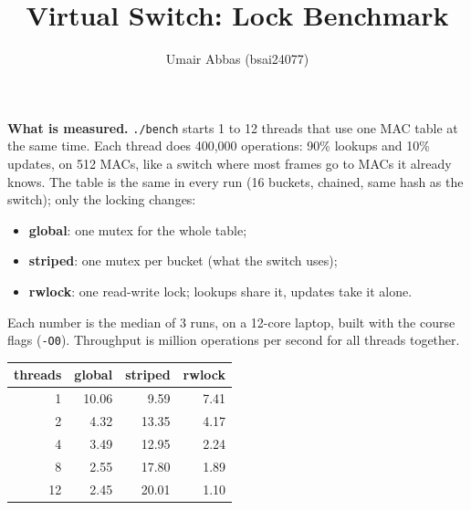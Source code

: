 \documentclass[11pt,a4paper]{article}
\title{Virtual Switch: Lock Benchmark}
\author{Umair Abbas \quad (bsai24077)}
\date{}
\begin{document}
\maketitle
\vspace{-1.5em}

\textbf{What is measured.} \texttt{./bench} starts 1 to 12 threads that use one MAC
table at the same time. Each thread does 400{,}000 operations: 90\% lookups and
10\% updates, on 512 MACs, like a switch where most frames go to MACs it already
knows. The table is the same in every run (16 buckets, chained, same hash as the
switch); only the locking changes:

\begin{itemize}
\setlength{\itemsep}{0pt}
\item \textbf{global}: one mutex for the whole table;
\item \textbf{striped}: one mutex per bucket (what the switch uses);
\item \textbf{rwlock}: one read-write lock; lookups share it, updates take it alone.
\end{itemize}

Each number is the median of 3 runs, on a 12-core laptop, built with the course
flags (\texttt{-O0}). Throughput is million operations per second for all threads together.

\begin{center}
\end{center}

\begin{center}
\begin{tabular}{rrrr}
\toprule
threads & global & striped & rwlock \\
\midrule
1 & 10.06 & 9.59 & 7.41 \\
2 & 4.32 & 13.35 & 4.17 \\
4 & 3.49 & 12.95 & 2.24 \\
8 & 2.55 & 17.80 & 1.89 \\
12 & 2.45 & 20.01 & 1.10 \\
\bottomrule
\end{tabular}
\end{center}
\end{document}
